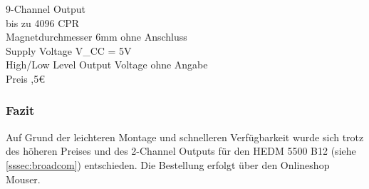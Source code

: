 \par\bigskip
\begin{benannteAuflistung}
    9-Channel Output \\
    bis zu 4096 CPR \\
    Magnetdurchmesser 6mm ohne Anschluss \\
    Supply Voltage V_{CC} = 5V \\
    High/Low Level Output Voltage ohne Angabe \\
    Preis ,5€
\end{benannteAuflistung}

\subsubsection{Fazit}
Auf Grund der leichteren Montage und schnelleren Verfügbarkeit wurde sich trotz des höheren Preises und des 2-Channel Outputs für den HEDM 5500 B12 (siehe \ref{sssec:broadcom}) entschieden. Die Bestellung erfolgt über den Onlineshop Mouser.